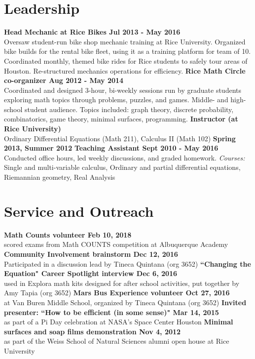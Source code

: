 \documentclass[margin,line]{res}
\begin{document}
\begin{resume}
\section{\sc Leadership}
{\bf Head Mechanic at Rice Bikes \hfill Jul 2013 - May 2016} \\
Oversaw student-run bike shop mechanic training at Rice University. Organized bike builds for the rental bike fleet, using it as a training platform for team of 10. Coordinated monthly, themed bike rides for Rice students to safely tour areas of Houston. Re-structured mechanics operations for efficiency.
\vskip -5pt
{\bf Rice Math Circle co-organizer \hfill Aug 2012 - May 2014}\\
Coordinated and designed 3-hour, bi-weekly sessions run by graduate students exploring math topics through problems, puzzles, and games. Middle- and high-school student audience. Topics included: graph theory, discrete probability, combinatorics, game theory, minimal surfaces, programming.
\vskip -5pt
{\bf Instructor (at Rice University)} \\
Ordinary Differential Equations (Math 211), Calculus II (Math 102) \hfill {\bf Spring 2013, Summer 2012}
\vskip -5pt
{\bf Teaching Assistant \hfill Sept 2010 - May 2016}\\
Conducted office hours, led weekly discussions, and graded homework. {\em Courses:} Single and multi-variable calculus, Ordinary and partial differential equations, Riemannian geometry, Real Analysis

\section{\sc Service and Outreach}
{\bf Math Counts volunteer \hfill Feb 10, 2018}\\
scored exams from Math COUNTS competition at Albuquerque Academy
\vskip -5pt
{\bf Community Involvement brainstorm \hfill Dec 12, 2016}\\
Participated in a discussion lead by Tineca Quintana (org 3652)
\vskip -5pt
{\bf ``Changing the Equation" Career Spotlight interview \hfill Dec 6, 2016}\\
used in Explora math kits designed for after school activities, put together by Amy Tapia (org 3652)
\vskip -5pt
{\bf Mars Bus Experience volunteer \hfill Oct 27, 2016}\\
at Van Buren Middle School, organized by Tineca Quintana (org 3652)
\vskip -5pt
{\bf Invited presenter: ``How to be efficient (in some sense)" \hfill Mar 14, 2015} \\
as part of a Pi Day celebration at NASA's Space Center Houston
\vskip -5pt
{\bf Minimal surfaces and soap films demonstration \hfill Nov 4, 2012} \\
as part of the Weiss School of Natural Sciences alumni open house at Rice University

\begin{comment}
\section{\sc Hobbies and Interests}
Bicycling, rock climbing, racquetball, Arduino hacks
\end{comment}


\end{resume}
\end{document}
